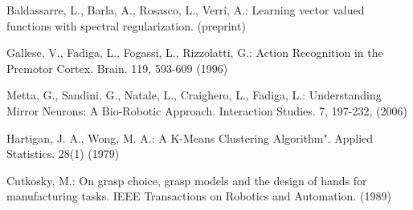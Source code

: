 \begin{thebibliography}{4}
 Baldassarre, L., Barla, A.,  Rosasco, L., Verri, A.:
Learning vector valued functions with spectral regularization. (preprint)




 Gallese, V., Fadiga, L., Fogassi, L., Rizzolatti, G.: Action Recognition in the Premotor Cortex. Brain. 119, 593-609 (1996)


 Metta, G., Sandini, G., Natale, L., Craighero, L., Fadiga, L.: Understanding  Mirror Neurons: A Bio-Robotic Approach. Interaction Studies. 7, 197-232, (2006)





 Hartigan, J. A., Wong, M. A.: A K-Means Clustering Algorithm". Applied Statistics. 28(1) (1979) 

 Cutkosky, M.: On grasp choice, grasp models and the design of hands for manufacturing tasks. IEEE Transactions on Robotics and
Automation. (1989)


\end{thebibliography}
